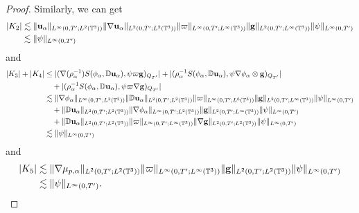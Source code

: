 \documentclass[reqno,a4paper,11pt]{amsart}
\theoremstyle{plain}
\numberwithin{equation}{section}
\newcommand{\bg}{\mathbf{g}}
\begin{document}
\begin{proof}
					Similarly, we can get
					\begin{align}\label{K_{2}}
						\nonumber|K_{2}|&\lesssim \|\mathbf{u}_{\alpha} \|_{L^{\infty}(0,T';L^{2}(\mathbb{T}^{3}))}\|\nabla\mathbf{u}_{\alpha} \|_{L^{2}(0,T';L^{2}(\mathbb{T}^{3}))}\|\varpi\|_{L^{\infty}(0,T';L^{\infty}(\mathbb{T}^{3}))}\|\bg\|_{L^{2}(0,T';L^{\infty}(\mathbb{T}^{3}))}\|\psi\|_{L^{\infty}(0,T')}
						\\&\lesssim \|\psi\|_{L^{\infty}(0,T')}
					\end{align}
					and
					\begin{align}\label{K_{3}}
						\nonumber|K_{3}|+|K_{4}|&\leq|(\nabla(\rho_{\alpha}^{-1})S(\phi_{\alpha},\mathbb{ D}\mathbf{u}_{\alpha}), \psi\varpi\bg)_{Q_{T'}}|+|(\rho_{\alpha}^{-1}S(\phi_{\alpha},\mathbb{ D}\mathbf{u}_{\alpha}), \psi\nabla\phi_{\alpha}\otimes\bg)_{Q_{T'}}|
						\\&\nonumber\quad+|(\rho_{\alpha}^{-1}S(\phi_{\alpha},\mathbb{ D}\mathbf{u}_{\alpha}), \psi\varpi\nabla\bg)_{Q_{T'}}|
						\\&\lesssim\nonumber\|\nabla\phi_{\alpha} \|_{L^{\infty}(0,T';L^{3}(\mathbb{T}^{3}))}\|\mathbb{ D}\mathbf{u}_{\alpha} \|_{L^{2}(0,T';L^{2}(\mathbb{T}^{3}))}\|\varpi\|_{L^{\infty}(0,T';L^{6}(\mathbb{T}^{3}))}\|\bg\|_{L^{2}(0,T';L^{\infty}(\mathbb{T}^{3}))}\|\psi\|_{L^{\infty}(0,T')}
						\\& \nonumber\quad+\|\mathbb{ D}\mathbf{u}_{\alpha}\|_{L^{2}(0,T';L^{2}(\mathbb{T}^{3}))}\|\nabla\phi_{\alpha}\|_{L^{\infty}(0,T';L^{2}(\mathbb{T}^{3}))}\|\bg\|_{L^{2}(0,T';L^{\infty}(\mathbb{T}^{3}))}\|\psi\|_{L^{\infty}(0,T')}
						\\& \nonumber\quad + \|\mathbb{ D}\mathbf{u}_{\alpha}\|_{L^{2}(0,T';L^{2}(\mathbb{T}^{3}))}\|\varpi\|_{L^{\infty}(0,T';L^{\infty}(\mathbb{T}^{3}))}\|\nabla \bg\|_{L^{2}(0,T';L^{2}(\mathbb{T}^{3}))}\|\psi\|_{L^{\infty}(0,T')}
						\\&\lesssim \|\psi\|_{L^{\infty}(0,T')}
					\end{align}
					and
					\begin{align}\label{K_{4}}
						\nonumber|K_{5}| &\lesssim \|\nabla\mu_{p,\alpha} \|_{L^{2}(0,T';L^{2}(\mathbb{T}^{3}))}\|\varpi\|_{L^{\infty}(0,T';L^{\infty}(\mathbb{T}^{3}))}\|\bg\|_{L^{2}(0,T';L^{2}(\mathbb{T}^{3}))}\|\psi\|_{L^{\infty}(0,T')}
						\\& \lesssim \|\psi\|_{L^{\infty}(0,T')}.
					\end{align}
					

\end{proof}
\end{document}
